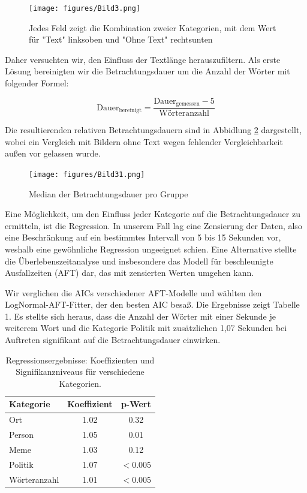 \documentclass[
    language=german, %
    thesis=seminar, %
    supervisor=postdoc, %
    multiauthor=true, %
    ]{settings/csssa-thesis}
\begin{document}
\begin{figure}[htbp]
    \centering
    \texttt{[image: figures/Bild3.png]}
    \caption{Jedes Feld zeigt die Kombination zweier Kategorien, mit dem Wert für "Text" linksoben und "Ohne Text" rechtsunten}\label{fig:katMatrix}
\end{figure}


Daher versuchten wir, den Einfluss der Textlänge herauszufiltern. Als erste Lösung bereinigten 
wir die Betrachtungsdauer um die Anzahl der Wörter mit folgender Formel:

\[
\text{Dauer}_{\text{bereinigt}} = \frac{\text{Dauer}_{\text{gemessen}} - 5}{\text{Wörteranzahl}}
\]


Die resultierenden relativen Betrachtungsdauern sind in Abbidlung \ref{fig:bild27} dargestellt, 
wobei ein Vergleich mit Bildern ohne Text wegen fehlender Vergleichbarkeit au{\ss}en vor gelassen wurde.

\begin{figure}[htbp]
    \centering
    \texttt{[image: figures/Bild31.png]}
    \caption{Median der Betrachtungsdauer pro Gruppe}
    \label{fig:bild27}
\end{figure}

Eine Möglichkeit, um den Einfluss jeder Kategorie auf die Betrachtungsdauer zu ermitteln, 
ist die Regression. In unserem Fall lag eine Zensierung der Daten, also eine Beschränkung 
auf ein bestimmtes Intervall von 5 bis 15 Sekunden vor, weshalb eine gewöhnliche Regression 
ungeeignet schien. Eine Alternative stellte die Überlebenszeitanalyse und insbesondere das Modell 
für beschleunigte Ausfallzeiten (AFT) dar, das mit zensierten Werten umgehen kann.

Wir verglichen die AICs verschiedener AFT-Modelle und wählten den LogNormal-AFT-Fitter, 
der den besten AIC besa{\ss}. Die Ergebnisse zeigt Tabelle 1. Es stellte sich heraus, dass die Anzahl 
der Wörter mit einer Sekunde je weiterem Wort und die Kategorie Politik mit zusätzlichen 1,07 Sekunden 
bei Auftreten signifikant auf die Betrachtungsdauer einwirken.

\begin{table}[htbp]
\centering
\begin{tabular}{lcc}
\hline
\textbf{Kategorie} & \textbf{Koeffizient} & \textbf{p-Wert} \\
\hline
Ort          & 1.02 & 0.32      \\
Person       & 1.05 & 0.01      \\
Meme         & 1.03 & 0.12      \\
Politik      & 1.07 & $<0.005$ \\
Wörteranzahl & 1.01 & $<0.005$ \\
\hline
\end{tabular}
\caption{Regressionsergebnisse: Koeffizienten und Signifikanzniveaus für verschiedene Kategorien.}
\label{tab:kategorien}
\end{table}
\end{document}
